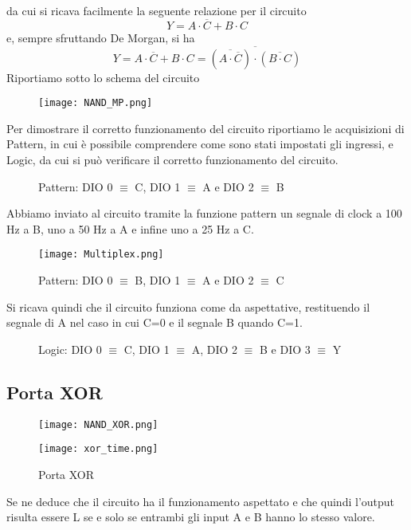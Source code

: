 \documentclass[10pt, a4paper, italian]{article}
\begin{document}
da cui si ricava facilmente la seguente relazione per il circuito
\[
Y=A\cdot\overline{C}+B\cdot C
\]
e, sempre sfruttando De Morgan, si ha
\[
Y=A\cdot\overline{C}+B\cdot C=\overline{(\overline{A\cdot\overline{C}})\cdot(\overline{B\cdot C})}
\]
Riportiamo sotto lo schema del circuito
\begin{figure}[htbp]
    \centering
    \texttt{[image: NAND\_MP.png]}
    \label{circuito2}
\end{figure}

Per dimostrare il corretto funzionamento del circuito riportiamo le acquisizioni di Pattern, in cui è possibile comprendere come sono stati impostati gli ingressi, e Logic, da cui si può verificare il corretto funzionamento del circuito.
\begin{figure}[htbp]
    \centering
    \caption{Pattern: DIO 0 $\equiv$ C, DIO 1 $\equiv$ A e DIO 2 $\equiv$ B}
\end{figure}
Abbiamo inviato al circuito tramite la funzione pattern un segnale di clock a 100 Hz a B, uno a 50 Hz a A e infine uno a 25 Hz a C.
\begin{figure}[htb!]
    \centering
    \texttt{[image: Multiplex.png]}
    \caption{Pattern: DIO 0 $\equiv$ B, DIO 1 $\equiv$ A e DIO 2 $\equiv$ C}
    \label{pat2}
\end{figure}
Si ricava quindi che il circuito funziona come da aspettative, restituendo il segnale di A nel caso in cui C=0 e il segnale B quando C=1.

\begin{figure}[htbp]
    \centering
    \caption{Logic: DIO 0 $\equiv$ C, DIO 1 $\equiv$ A, DIO 2 $\equiv$ B e DIO 3 $\equiv$ Y}
\end{figure}

\subsection{Porta XOR}
\begin{figure}[htb!]
    \centering
    \texttt{[image: NAND\_XOR.png]}
    \label{circuito3}
\end{figure}
\begin{figure}[htb!]
    \centering
    \texttt{[image: xor\_time.png]}
    \caption{Porta XOR}
    \label{pat2}
\end{figure}
Se ne deduce che il circuito ha il funzionamento aspettato e che quindi l'output risulta essere L se e solo se entrambi gli input A e B hanno lo stesso valore.
\end{document}
